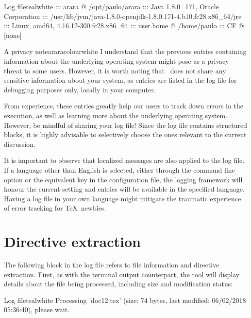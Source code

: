 \begin{codebox}{Log file}{teal}{\icnote}{white}
::: arara @ /opt/paulo/arara
::: Java 1.8.0_171, Oracle Corporation
::: /usr/lib/jvm/java-1.8.0-openjdk-1.8.0.171-4.b10.fc28.x86_64/jre
::: Linux, amd64, 4.16.12-300.fc28.x86_64
::: user.home @ /home/paulo
::: CF @ [none]
\end{codebox}

\begin{messagebox}{A privacy note}{araracolour}{\icok}{white}
\setlength{\parskip}{1em}
I understand that the previous entries containing information about the underlying operating system might pose as a privacy threat to some users. However, it is worth noting that \arara\ does not share any sensitive information about your system, as entries are listed in the log file for debugging purposes only, locally in your computer.

From experience, these entries greatly help our users to track down errors in the execution, as well as learning more about the underlying operating system. However, be mindful of sharing your log file! Since the log file contains structured blocks, it is highly advisable to selectively choose the ones relevant to the current discussion.
\end{messagebox}

It is important to observe that localized messages are also applied to the log file. If a language other than English is selected, either through the  command line option or the equivalent key in the configuration file, the logging framework will honour the current setting and entries will be available in the specified language. Having a log file in your own language might mitigate the traumatic experience of error tracking for \TeX\ newbies.

\section{Directive extraction}
\label{sec:directiveextraction}

The following block in the log file refers to file information and directive extraction. First, as with the terminal output counterpart, the tool will display details about the file being processed, including size and modification status:

\begin{codebox}{Log file}{teal}{\icnote}{white}
Processing 'doc12.tex' (size: 74 bytes, last modified:
06/02/2018 05:36:40), please wait.
\end{codebox}

